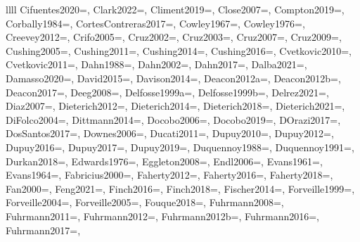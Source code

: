 \documentclass[twocolumn,tighten,twocolappendix]{aastex631}
\begin{document}
\begin{deluxetable*}{llll}
{Cifuentes2020=\cite{cifuentes2020},
Clark2022=\cite{clark2022},
Climent2019=\cite{climent2019},
Close2007=\cite{close2007},
Compton2019=\cite{compton2019},
Corbally1984=\cite{corbally1984},
CortesContreras2017=\cite{cortescontreras2017},
Cowley1967=\cite{cowley1967},
Cowley1976=\cite{cowley1976},
Creevey2012=\cite{creevey2012},
Crifo2005=\cite{crifo2005},
Cruz2002=\cite{cruz2002},
Cruz2003=\cite{cruz2003},
Cruz2007=\cite{cruz2007},
Cruz2009=\cite{cruz2009},
Cushing2005=\cite{cushing2005},
Cushing2011=\cite{cushing2011},
Cushing2014=\cite{cushing2014},
Cushing2016=\cite{cushing2016},
Cvetkovic2010=\cite{cvetkovic2010},
Cvetkovic2011=\cite{cvetkovic2011},
Dahn1988=\cite{dahn1988},
Dahn2002=\cite{dahn2002},
Dahn2017=\cite{dahn2017},
Dalba2021=\cite{dalba2021},
Damasso2020=\cite{damasso2020},
David2015=\cite{david2015},
Davison2014=\cite{davison2014},
Deacon2012a=\cite{deacon2012a},
Deacon2012b=\cite{deacon2012b},
Deacon2017=\cite{deacon2017},
Deeg2008=\cite{deeg2008},
Delfosse1999a=\cite{delfosse1999a},
Delfosse1999b=\cite{delfosse1999b},
Delrez2021=\cite{delrez2021},
Diaz2007=\cite{diaz2007},
Dieterich2012=\cite{dieterich2012},
Dieterich2014=\cite{dieterich2014},
Dieterich2018=\cite{dieterich2018},
Dieterich2021=\cite{dieterich2021},
DiFolco2004=\cite{difolco2004},
Dittmann2014=\cite{dittmann2014},
Docobo2006=\cite{docobo2006},
Docobo2019=\cite{docobo2019},
DOrazi2017=\cite{dorazi2017},
DosSantos2017=\cite{dossantos2017},
Downes2006=\cite{downes2006},
Ducati2011=\cite{ducati2011},
Dupuy2010=\cite{dupuy2010},
Dupuy2012=\cite{dupuy2012},
Dupuy2016=\cite{dupuy2016},
Dupuy2017=\cite{dupuy2017},
Dupuy2019=\cite{dupuy2019},
Duquennoy1988=\cite{duquennoy1988},
Duquennoy1991=\cite{duquennoy1991},
Durkan2018=\cite{durkan2018},
Edwards1976=\cite{edwards1976},
Eggleton2008=\cite{eggleton2008},
Endl2006=\cite{endl2006},
Evans1961=\cite{evans1961},
Evans1964=\cite{evans1964},
Fabricius2000=\cite{fabricius2000},
Faherty2012=\cite{faherty2012},
Faherty2016=\cite{faherty2016},
Faherty2018=\cite{faherty2018},
Fan2000=\cite{fan2000},
Feng2021=\cite{feng2021},
Finch2016=\cite{finch2016},
Finch2018=\cite{finch2018},
Fischer2014=\cite{fischer2014},
Forveille1999=\cite{forveille1999},
Forveille2004=\cite{forveille2004},
Forveille2005=\cite{forveille2005},
Fouque2018=\cite{fouque2018},
Fuhrmann2008=\cite{fuhrmann2008},
Fuhrmann2011=\cite{fuhrmann2011},
Fuhrmann2012=\cite{fuhrmann2012},
Fuhrmann2012b=\cite{fuhrmann2012b},
Fuhrmann2016=\cite{fuhrmann2016},
Fuhrmann2017=\cite{fuhrmann2017},
}
\end{deluxetable*}
\end{document}
